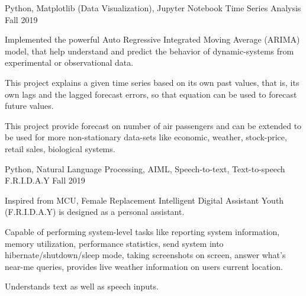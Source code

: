 \begin{cventries}
  \cventry
    {Python, Matplotlib (Data Visualization), Jupyter Notebook} %
    {Time Series Analysis} %
    {} %
    {Fall 2019} %
    {
      \begin{cvitems} %
        \item {Implemented the powerful Auto Regressive Integrated Moving Average (ARIMA) model, that help understand and predict the behavior of dynamic-systems from experimental or observational data.}
        \item {This project explains a given time series based on its own past values, that is, its own lags and the lagged forecast errors, so that equation can be used to forecast future values.}
        \item {This project provide forecast on number of air passengers and can be extended to be used for more non-stationary data-sets like economic, weather, stock-price, retail sales, biological systems.}
      \end{cvitems}
    }

  \cventry
    {Python, Natural Language Processing, AIML, Speech-to-text, Text-to-speech} %
    {F.R.I.D.A.Y} %
    {} %
    {Fall 2019} %
    {
      \begin{cvitems} %
        \item {Inspired from MCU, Female Replacement Intelligent Digital Assistant Youth (F.R.I.D.A.Y) is designed as a personal assistant.}
        \item {Capable of performing system-level tasks like reporting system information, memory utilization, performance statistics, send system into hibernate/shutdown/sleep mode, taking screenshots on screen, answer what's near-me queries, provides live weather information on users current location.}
        \item {Understands text as well as speech inputs.}
      \end{cvitems}
    }

\end{cventries}
